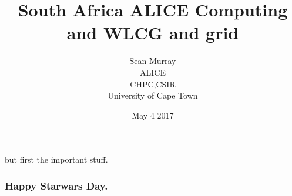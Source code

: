 \documentclass{beamer}
\title{South Africa ALICE Computing and WLCG and grid}
\author{Sean Murray \\
    ALICE \\
    CHPC,CSIR \\
    University of Cape Town 
}
\date{May 4 2017}
\begin{document}
\begin{frame}
\titlepage
but first the important stuff.
\end{frame}

\begin{frame}
    \frametitle{Happy Starwars Day.}
\end{frame}
\end{document}

